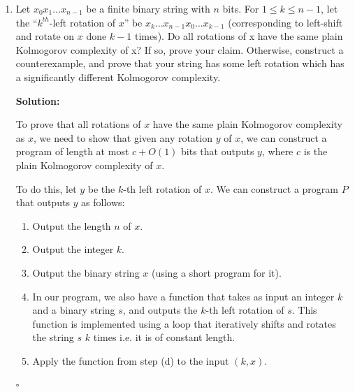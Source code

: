 \documentclass[10pt]{article}
\newenvironment{solution}{\textbf{Solution:}}{\hfill$\square$}
\begin{document}
\begin{enumerate}
\begin{solution}
    If $M$ has not output a string in $L$ on any input in $\{1,2,\dots,k\}$, continue to the next step of the dovetailing.
    
    The resulting subset of $L$ is clearly decidable, since we can decide whether any string is a member of the subset by running the above algorithm for long enough to see whether that string is output.
    
    To see that the resulting subset is infinite, note that since $L$ is infinite and $M$ eventually simulates every input infinitely often, there must be infinitely many inputs on which $M$ outputs a string in $L$. Therefore, the decidable subset we construct contains infinitely many strings.
        
    \end{solution}
    \newpage

    \item  Let $x_0x_1\ldots x_{n-1}$ be a finite binary string with $n$ bits. For $1\leq k\leq n - 1$, let the “$k^{th}$-left rotation of $x$” be $x_k \ldots x_{n-1}x_0\ldots x_{k-1}$ (corresponding to left-shift and rotate on $x$ done $k -1$ times). Do all rotations of x have the same plain Kolmogorov complexity of x? If so, prove your claim. Otherwise, construct a counterexample, and prove that your string has some left rotation which has a significantly different Kolmogorov complexity.

    \begin{solution}

    To prove that all rotations of $x$ have the same plain Kolmogorov complexity as $x$, we need to show that given any rotation $y$ of $x$, we can construct a program of length at most $c + O(1)$ bits that outputs $y$, where $c$ is the plain Kolmogorov complexity of $x$.
    
    To do this, let $y$ be the $k$-th left rotation of $x$. We can construct a program $P$ that outputs $y$ as follows:

    \begin{enumerate}
        \item Output the length $n$ of $x$.
        \item Output the integer $k$.
        \item Output the binary string $x$ (using a short program for it).
        \item In our program, we also have a function that takes as input an integer $k$ and a binary string $s$, and outputs the $k$-th left rotation of $s$. This function is implemented using a loop that iteratively shifts and rotates the string $s$ $k$ times i.e. it is of constant length.
        \item Apply the function from step (d) to the input $(k, x)$.
    \end{enumerate}
    

\end{solution}
\end{enumerate}
\end{document}
